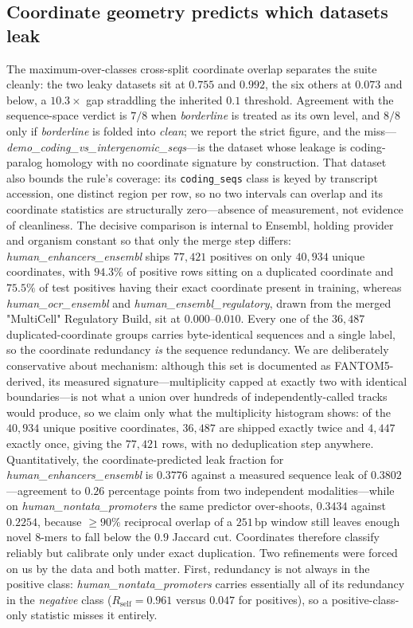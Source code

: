 \subsection{Coordinate geometry predicts which datasets leak}\label{sec:r-coord}
The maximum-over-classes cross-split coordinate overlap separates the suite cleanly: the two leaky datasets sit at $0.755$ and $0.992$, the six others at $0.073$ and below, a $10.3\times$ gap straddling the inherited $0.1$ threshold. Agreement with the sequence-space verdict is $7/8$ when \emph{borderline} is treated as its own level, and $8/8$ only if \emph{borderline} is folded into \emph{clean}; we report the strict figure, and the miss---\textit{demo\_coding\_vs\_intergenomic\_seqs}---is the dataset whose leakage is coding-paralog homology with no coordinate signature by construction. That dataset also bounds the rule's coverage: its \texttt{coding\_seqs} class is keyed by transcript accession, one distinct region per row, so no two intervals can overlap and its coordinate statistics are structurally zero---absence of measurement, not evidence of cleanliness. The decisive comparison is internal to Ensembl, holding provider and organism constant so that only the merge step differs: \textit{human\_enhancers\_ensembl} ships $77{,}421$ positives on only $40{,}934$ unique coordinates, with $94.3\%$ of positive rows sitting on a duplicated coordinate and $75.5\%$ of test positives having their exact coordinate present in training, whereas \textit{human\_ocr\_ensembl} and \textit{human\_ensembl\_regulatory}, drawn from the merged "MultiCell" Regulatory Build, sit at $0.000$--$0.010$. Every one of the $36{,}487$ duplicated-coordinate groups carries byte-identical sequences and a single label, so the coordinate redundancy \emph{is} the sequence redundancy. We are deliberately conservative about mechanism: although this set is documented as FANTOM5-derived, its measured signature---multiplicity capped at exactly two with identical boundaries---is not what a union over hundreds of independently-called tracks would produce, so we claim only what the multiplicity histogram shows: of the $40{,}934$ unique positive coordinates, $36{,}487$ are shipped exactly twice and $4{,}447$ exactly once, giving the $77{,}421$ rows, with no deduplication step anywhere. Quantitatively, the coordinate-predicted leak fraction for \textit{human\_enhancers\_ensembl} is $0.3776$ against a measured sequence leak of $0.3802$---agreement to $0.26$ percentage points from two independent modalities---while on \textit{human\_nontata\_promoters} the same predictor over-shoots, $0.3434$ against $0.2254$, because $\ge90\%$ reciprocal overlap of a $251$\,bp window still leaves enough novel $8$-mers to fall below the $0.9$ Jaccard cut. Coordinates therefore classify reliably but calibrate only under exact duplication. Two refinements were forced on us by the data and both matter. First, redundancy is not always in the positive class: \textit{human\_nontata\_promoters} carries essentially all of its redundancy in the \emph{negative} class ($R_{\mathrm{self}}=0.961$ versus $0.047$ for positives), so a positive-class-only statistic misses it entirely. 